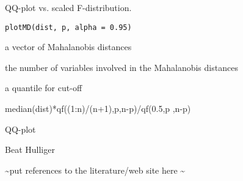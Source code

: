 %
\begin{Description}\relax
QQ-plot vs. scaled F-distribution.
\end{Description}
%
\begin{Usage}
\begin{verbatim}
plotMD(dist, p, alpha = 0.95)
\end{verbatim}
\end{Usage}
%
\begin{Arguments}
\begin{ldescription}
\item[\code{dist}]  a vector of Mahalanobis distances 
\item[\code{p}]  the number of variables involved in the Mahalanobis distances
\item[\code{alpha}]  a quantile for cut-off
\end{ldescription}
\end{Arguments}
%
\begin{Details}\relax
median(dist)*qf((1:n)/(n+1),p,n-p)/qf(0.5,p ,n-p)
\end{Details}
%
\begin{Value}
QQ-plot
\end{Value}
%
\begin{Author}\relax
Beat Hulliger
\end{Author}
%
\begin{References}\relax
 \textasciitilde{}put references to the literature/web site here \textasciitilde{} 
\end{References}
